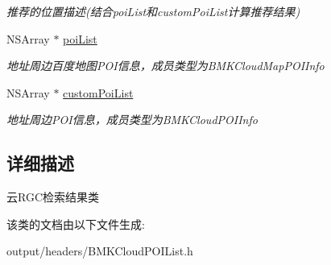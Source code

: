 \begin{DoxyCompactItemize}
\begin{DoxyCompactList}\small\item\em 推荐的位置描述(结合poi\+List和custom\+Poi\+List计算推荐结果) \end{DoxyCompactList}\item 
\hypertarget{interface_b_m_k_cloud_reverse_geo_code_result_a60d077f7782edf782763fd8aeb98eb17}{}N\+S\+Array $\ast$ \hyperlink{interface_b_m_k_cloud_reverse_geo_code_result_a60d077f7782edf782763fd8aeb98eb17}{poi\+List}\label{interface_b_m_k_cloud_reverse_geo_code_result_a60d077f7782edf782763fd8aeb98eb17}

\begin{DoxyCompactList}\small\item\em 地址周边百度地图\+P\+O\+I信息，成员类型为\+B\+M\+K\+Cloud\+Map\+P\+O\+I\+Info \end{DoxyCompactList}\item 
\hypertarget{interface_b_m_k_cloud_reverse_geo_code_result_ab1be063cb7dec235a7083da1a3143f09}{}N\+S\+Array $\ast$ \hyperlink{interface_b_m_k_cloud_reverse_geo_code_result_ab1be063cb7dec235a7083da1a3143f09}{custom\+Poi\+List}\label{interface_b_m_k_cloud_reverse_geo_code_result_ab1be063cb7dec235a7083da1a3143f09}

\begin{DoxyCompactList}\small\item\em 地址周边\+P\+O\+I信息，成员类型为\+B\+M\+K\+Cloud\+P\+O\+I\+Info \end{DoxyCompactList}\end{DoxyCompactItemize}


\subsection{详细描述}
云\+R\+G\+C检索结果类 

该类的文档由以下文件生成\+:\begin{DoxyCompactItemize}
\item 
output/headers/B\+M\+K\+Cloud\+P\+O\+I\+List.\+h\end{DoxyCompactItemize}
